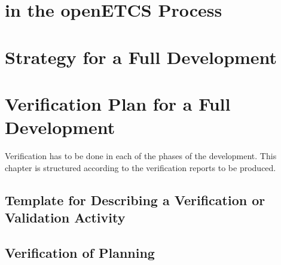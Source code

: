 \documentclass{template/openetcs_report}
\begin{document}

\chapter{\VV in the openETCS Process}
\label{sec:vv-openETCS-process}

%

\chapter{\VV Strategy for a Full Development }
\label{sec:vv-strategy-full}

%


\chapter{Verification Plan for a Full Development}
\label{sec:verification-plan-full}

%

Verification has to be done in each of the phases of the
development. This chapter is structured according to the verification
reports to be produced.

\setcounter{section}{-1}
\section{Template for Describing a Verification or Validation Activity}
\label{sec:VnV-template}



\section{Verification of Planning}
\label{sec:verification-full-0}
\end{document}
